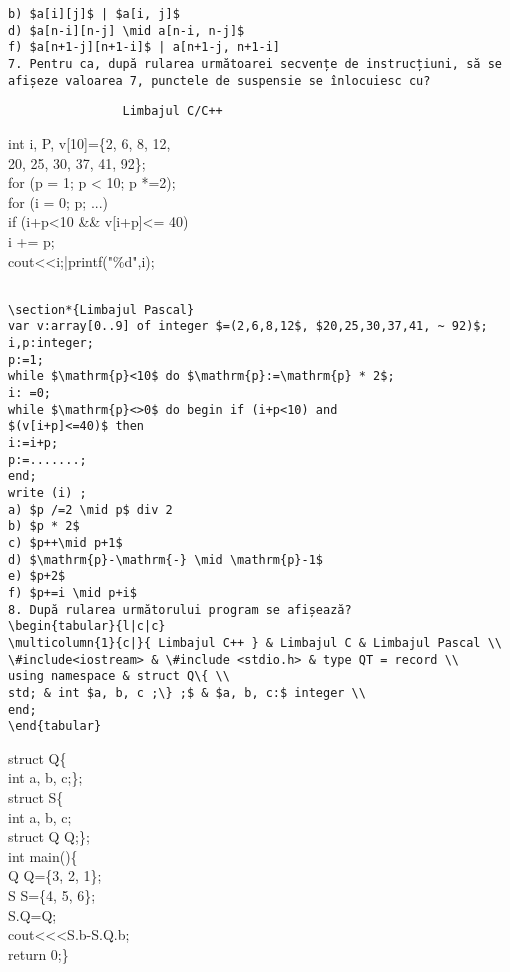 \begin{verbatim}
b) $a[i][j]$ | $a[i, j]$
d) $a[n-i][n-j] \mid a[n-i, n-j]$
f) $a[n+1-j][n+1-i]$ | a[n+1-j, n+1-i]
7. Pentru ca, după rularea următoarei secvențe de instrucțiuni, să se afișeze valoarea 7, punctele de suspensie se înlocuiesc cu?
\end{verbatim}

\begin{verbatim}
                Limbajul C/C++
\end{verbatim}

int i, P, v[10]=\{2, 6, 8, 12,\\
20, 25, 30, 37, 41, 92\};\\
for (p = 1; p < 10; p *=2);\\
for (i = 0; p; ...)\\[0pt]
if (i+p<10 \&\& v[i+p]<= 40)\\
i += p;\\
cout<<i;|printf("\%d",i);

\begin{verbatim}

\section*{Limbajul Pascal}
var v:array[0..9] of integer $=(2,6,8,12$, $20,25,30,37,41, ~ 92)$;
i,p:integer;
p:=1;
while $\mathrm{p}<10$ do $\mathrm{p}:=\mathrm{p} * 2$;
i: =0;
while $\mathrm{p}<>0$ do begin if (i+p<10) and
$(v[i+p]<=40)$ then
i:=i+p;
p:=.......;
end;
write (i) ;
a) $p /=2 \mid p$ div 2
b) $p * 2$
c) $p++\mid p+1$
d) $\mathrm{p}-\mathrm{-} \mid \mathrm{p}-1$
e) $p+2$
f) $p+=i \mid p+i$
8. După rularea următorului program se afișează?
\begin{tabular}{l|c|c}
\multicolumn{1}{c|}{ Limbajul C++ } & Limbajul C & Limbajul Pascal \\
\#include<iostream> & \#include <stdio.h> & type QT = record \\
using namespace & struct Q\{ \\
std; & int $a, b, c ;\} ;$ & $a, b, c:$ integer \\
end;
\end{tabular}
\end{verbatim}

struct Q\{\\
int a, b, c;\};\\
struct S\{\\
int a, b, c;\\
struct Q Q;\};\\
int main()\{\\
Q Q=\{3, 2, 1\};\\
S S=\{4, 5, 6\};\\
S.Q=Q;\\
cout<<<S.b-S.Q.b;\\
return 0;\}

